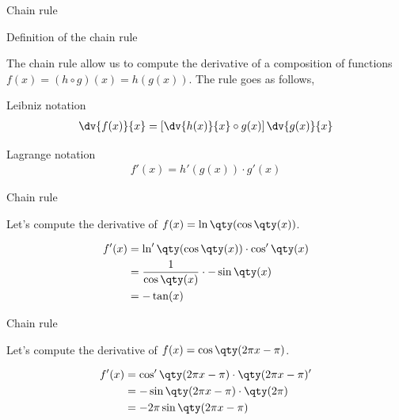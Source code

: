 \documentclass[../tufte-style.tex]{standalone}
\begin{document}
\date{February 23, 2026}

\begin{frame}{Chain rule}

\begin{block}{Definition of the chain rule}

The chain rule allow us to compute the derivative of a composition of functions \(f(x) = \left( h\circ g \right)(x)=h(g(x))\).
The rule goes as follows,

\vspace{2em}

\begin{minipage}{0.45\textwidth}
    \centering
     Leibniz notation
    \begin{gather*}
        \dv{f(x)}{x} = \left[\dv{h(x)}{x}\circ g(x)\right]\dv{g(x)}{x}
    \end{gather*}
\end{minipage}
\hfill
\begin{minipage}{0.45\textwidth}
    \centering
    Lagrange notation
    \begin{gather*}
        f'(x) = h'(g(x))\cdot g'(x) 
    \end{gather*}
\end{minipage}

\end{block}

\end{frame}

\begin{frame}{Chain rule}
\begin{examples}
Let's compute the derivative of \(f(x) = \ln\qty(\cos\qty(x))\).

\begin{align*}
    f'(x) &= \ln'\qty(\cos\qty(x))\cdot\cos'\qty(x) \\
          &= \frac{1}{\cos\qty(x)}\cdot-\sin\qty(x) \\
          &= -\tan(x)
\end{align*}

\end{examples}
\end{frame}

\begin{frame}{Chain rule}
\begin{examples}
Let's compute the derivative of \(f(x) = \cos\qty(2\pi x-\pi)\).

\begin{align*}
    f'(x) &= \cos'\qty(2\pi x-\pi)\cdot\qty(2\pi x-\pi)' \\
          &= -\sin\qty(2\pi x-\pi)\cdot\qty(2\pi) \\
          &= -2\pi\sin\qty(2\pi x-\pi)
\end{align*}

\end{examples}
\end{frame}
\end{document}

